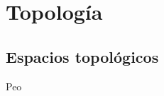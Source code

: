 \documentclass[../main.tex]{subfiles}
\begin{document}
\chapter{Topología}

\section{Espacios topológicos}
Peo
\end{document}
